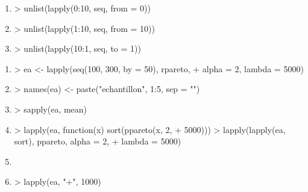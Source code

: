 \begin{reponse}{6.2}
    \begin{enumerate}
\item
\begin{Schunk}
\begin{Sinput}
> unlist(lapply(0:10, seq, from = 0))
\end{Sinput}
\end{Schunk}
\item
\begin{Schunk}
\begin{Sinput}
> unlist(lapply(1:10, seq, from = 10))
\end{Sinput}
\end{Schunk}
\item
\begin{Schunk}
\begin{Sinput}
> unlist(lapply(10:1, seq, to = 1))
\end{Sinput}
\end{Schunk}
    \end{enumerate}
  
\end{reponse}
\begin{reponse}{6.3}
    \begin{enumerate}
\item
\begin{Schunk}
\begin{Sinput}
> ea <- lapply(seq(100, 300, by = 50), rpareto,
+     alpha = 2, lambda = 5000)
\end{Sinput}
\end{Schunk}
\item
\begin{Schunk}
\begin{Sinput}
> names(ea) <- paste("echantillon", 1:5, sep = "")
\end{Sinput}
\end{Schunk}
\item
\begin{Schunk}
\begin{Sinput}
> sapply(ea, mean)
\end{Sinput}
\end{Schunk}
\item
\begin{Schunk}
\begin{Sinput}
> lapply(ea, function(x) sort(ppareto(x, 2,
+     5000)))
> lapply(lapply(ea, sort), ppareto, alpha = 2,
+     lambda = 5000)
\end{Sinput}
\end{Schunk}
\item
\begin{Schunk}
\end{Schunk}
\item
\begin{Schunk}
\begin{Sinput}
> lapply(ea, "+", 1000)
\end{Sinput}
\end{Schunk}
    \end{enumerate}
  
\end{reponse}
